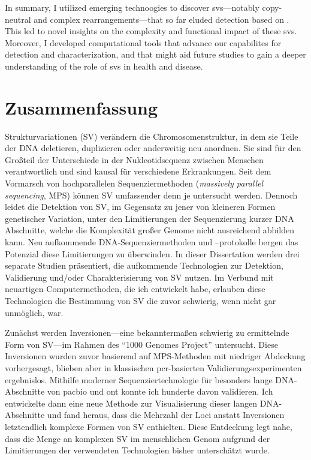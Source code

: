 In summary, I utilized emerging technoogies to discover \acp{sv}---notably
copy-neutral and complex rearrangements---that so far eluded detection based on
\mps. This led to novel insights on the complexity and functional impact of these
\acp{sv}. Moreover, I developed computational tools that advance our capabilites
for \sv detection and characterization, and that might aid future studies to gain a
deeper understanding of the role of \acp{sv} in health and disease.




\cleardoublepage
{}
\chapter*{Zusammenfassung}%
%

Strukturvariationen (SV) verändern die Chromosomenstruktur, in dem sie
Teile der DNA deletieren, duplizieren oder anderweitig neu anordnen. Sie sind für
den Großteil der Unterschiede in der Nukleotidsequenz zwischen Menschen verantwortlich
und sind kausal für verschiedene Er\-kran\-kun\-gen. Seit dem Vormarsch
von hochparallelen Sequenziermethoden (\textit{massively parallel sequencing},
MPS) können SV umfassender denn je untersucht werden. Dennoch leidet die Detektion von
SV, im Gegensatz zu jener von kleineren Formen genetischer Variation, unter den
Limitierungen der Sequenzierung kurzer DNA Abschnitte, welche die Komplexität
großer Genome nicht ausreichend abbilden kann. Neu aufkommende
DNA-Se\-quen\-zier\-me\-tho\-den und –protokolle bergen das Potenzial diese Limitierungen
zu überwinden. In dieser Dissertation werden drei separate Studien präsentiert,
die aufkommende Technologien zur Detektion, Validierung und/oder Charakterisierung
von SV nutzen. Im Verbund mit neuartigen Computermethoden, die ich entwickelt habe,
erlauben diese Technologien die Bestimmung von SV die zuvor schwierig, wenn
nicht gar unmöglich, war.

Zunächst werden Inversionen---eine bekanntermaßen schwierig zu ermittelnde Form
von SV---im Rahmen des ``1000 Genomes Project'' untersucht. Diese Inversionen wurden zuvor
basierend auf MPS-Methoden mit niedriger Ab\-de\-ckung vorhergesagt, blieben aber
in klassischen \acs{pcr}-basierten Va\-li\-die\-rungs\-ex\-pe\-ri\-men\-ten ergebnislos.
Mithilfe moderner
Sequenziertechnologie für besonders lange DNA\--Ab\-schnit\-te von \acl{pacbio}
und \acl{ont} konnte ich hunderte davon validieren. Ich entwickelte dann eine
neue Methode zur Visualisierung dieser langen DNA-Abschnitte und fand heraus,
dass die Mehrzahl der Loci anstatt Inversionen letztendlich komplexe Formen von
SV enthielten. Diese Entdeckung legt nahe, dass die Menge an komplexen SV im
menschlichen Genom aufgrund der Limitierungen der verwendeten Technologien bisher
unterschätzt wurde.

